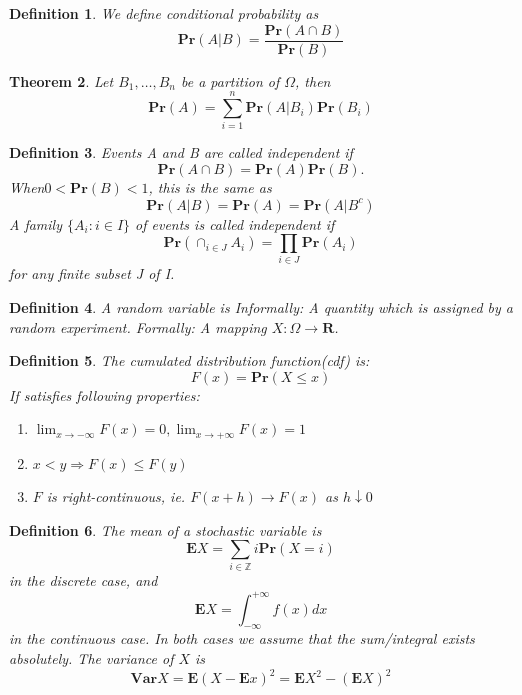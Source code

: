 \documentclass[11pt]{article}
\newcommand{\Ppb}{\mathbf{Pr}}
\newcommand{\Es}{\mathbf{E}}
\newcommand{\Var}{\mathbf{Var}}
\newcommand{\Real}{\mathbf{R}}
\newtheorem{theorem}{Theorem}
\newtheorem{definition}[theorem]{Definition}
\begin{document}
\begin{definition}
We define conditional probability as 
\begin{equation*}
    \Ppb(A | B)=\frac{\Ppb(A \cap B)}{\Ppb(B)}
\end{equation*}
\end{definition}
\begin{theorem}
Let $B_{1}, \dots, B_{n}$ be a partition of $\Omega$, then
\begin{equation}
\Ppb(A)=\sum_{i=1}^{n} \Ppb\left(A | B_{i}\right) \Ppb\left(B_{i}\right)
\end{equation}
\end{theorem}
\begin{definition}
Events A and B are called independent if
\begin{equation}
\Ppb(A \cap B)=\Ppb(A) \Ppb(B).
\end{equation}
When$ 0 < \Ppb(B) < 1$, this is the same as
\begin{equation}
\Ppb(A | B)=\Ppb(A)=\Ppb\left(A | B^{c}\right)
\end{equation}
A family $\{A_i : i \in I\}$ of events is called independent if
\begin{equation}
\Ppb\left(\cap_{i \in J} A_{i}\right)=\prod_{i \in J} \Ppb\left(A_{i}\right)
\end{equation}
for any finite subset J of I.
\end{definition}

\begin{definition}
A random variable is
Informally: A quantity which is assigned by a random experiment.
Formally: A mapping $X : \Omega \rightarrow \Real$.
\end{definition}
\begin{definition}
The cumulated distribution function(cdf) is:
\begin{equation}
F(x)=\Ppb(X \leq x)
\end{equation}
If satisfies following properties:
\begin{enumerate}
    \item $\lim _{x \rightarrow-\infty} F(x)=0, \lim _{x \rightarrow+\infty} F(x)=1$
    \item $x<y \Rightarrow F(x) \leq F(y)$
    \item $F$ is right-continuous, ie. $F(x+h) \rightarrow F(x)$ as $h \downarrow 0$
\end{enumerate}
\end{definition}
\begin{definition}
The mean of a stochastic variable is
$$
\Es X=\sum_{i \in \mathbb{Z}} i \Ppb(X=i)
$$
in the discrete case, and
$$
\Es X=\int_{-\infty}^{+\infty} f(x) d x
$$
in the continuous case. In both cases we assume that the
sum/integral exists absolutely.
The variance of $X$ is
$$
\Var X=\Es(X-\Es x)^{2}=\Es X^{2}-(\Es X)^{2}
$$
\end{definition}
\end{document}
